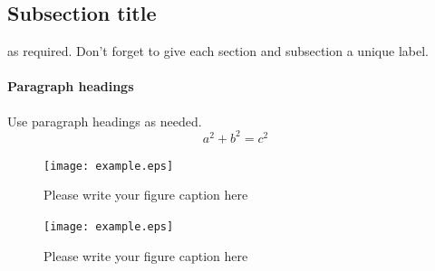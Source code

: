 





\subsection{Subsection title}
\label{sec:2}
as required. Don't forget to give each section
and subsection a unique label.
\paragraph{Paragraph headings} Use paragraph headings as needed.
\begin{equation}
a^2+b^2=c^2
\end{equation}

\begin{figure}
  \texttt{[image: example.eps]}
\caption{Please write your figure caption here}
\label{fig:1}       %
\end{figure}
%
\begin{figure}
  \texttt{[image: example.eps]}
\caption{Please write your figure caption here}
\label{fig:2}       %
\end{figure}

